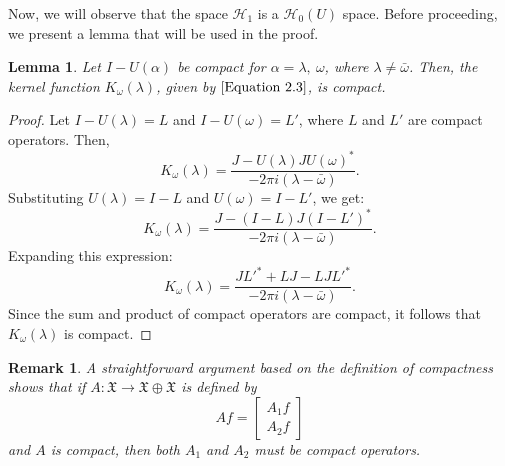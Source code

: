 \documentclass [12pt,reqno]{amsart}
\numberwithin{equation}{subsection}
\newtheorem{lemma}[thm]{Lemma}
\newtheorem{rmk}[thm]{Remark}
\numberwithin{equation}{section}
\begin{document}
Now, we will observe that the space \( \mathcal{H}_1 \) is a \( \mathcal{H}_0 (U) \) space. Before proceeding, we present a lemma that will be used in the proof.



\begin{lemma}\label{Lemma 3.4}
Let \( I - U(\alpha) \) be compact for \( \alpha = \lambda,~ \omega \), where \( \lambda \neq \bar{\omega} \). Then, the kernel function \( K_{\omega}(\lambda) \), given by $\eqref{Equation 2.3}$, is compact.
\end{lemma}

\begin{proof}
Let \( I - U(\lambda) = L \) and \( I - U(\omega) = L' \), where \( L \) and \( L' \) are compact operators. Then,
\[
K_{\omega}(\lambda) = \frac{J - U(\lambda) J U(\omega)^*}{-2 \pi i (\lambda - \bar{\omega})}.
\]
Substituting \( U(\lambda) = I - L \) and \( U(\omega) = I - L' \), we get:
\[
K_{\omega}(\lambda) = \frac{J - (I - L) J (I - L')^*}{-2 \pi i (\lambda - \bar{\omega})}.
\]
Expanding this expression:
\[
K_{\omega}(\lambda) = \frac{J L'^* + L J - L J L'^*}{-2 \pi i (\lambda - \bar{\omega})}.
\]
Since the sum and product of compact operators are compact, it follows that \( K_{\omega}(\lambda) \) is compact.
\end{proof}


\begin{rmk} \label{Remark 3.5}
A straightforward argument based on the definition of compactness shows that if \( A: \mathfrak{X} \rightarrow \mathfrak{X} \oplus \mathfrak{X} \) is defined by
\[
Af = \begin{bmatrix}
A_1 f \\
A_2 f
\end{bmatrix}
\]
and $A$ is compact, then both \( A_1 \) and \( A_2 \) must be compact operators.
\end{rmk}


\end{document}
